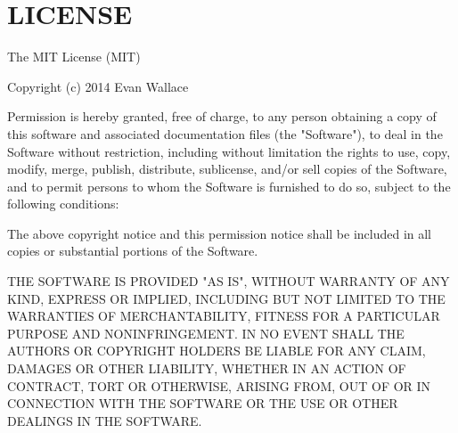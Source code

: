 \chapter{LICENSE}
\hypertarget{md_node__modules_2jest-runner_2node__modules_2source-map-support_2_l_i_c_e_n_s_e}{}\label{md_node__modules_2jest-runner_2node__modules_2source-map-support_2_l_i_c_e_n_s_e}
The MIT License (MIT)

Copyright (c) 2014 Evan Wallace

Permission is hereby granted, free of charge, to any person obtaining a copy of this software and associated documentation files (the "{}\+Software"{}), to deal in the Software without restriction, including without limitation the rights to use, copy, modify, merge, publish, distribute, sublicense, and/or sell copies of the Software, and to permit persons to whom the Software is furnished to do so, subject to the following conditions\+:

The above copyright notice and this permission notice shall be included in all copies or substantial portions of the Software.

THE SOFTWARE IS PROVIDED "{}\+AS IS"{}, WITHOUT WARRANTY OF ANY KIND, EXPRESS OR IMPLIED, INCLUDING BUT NOT LIMITED TO THE WARRANTIES OF MERCHANTABILITY, FITNESS FOR A PARTICULAR PURPOSE AND NONINFRINGEMENT. IN NO EVENT SHALL THE AUTHORS OR COPYRIGHT HOLDERS BE LIABLE FOR ANY CLAIM, DAMAGES OR OTHER LIABILITY, WHETHER IN AN ACTION OF CONTRACT, TORT OR OTHERWISE, ARISING FROM, OUT OF OR IN CONNECTION WITH THE SOFTWARE OR THE USE OR OTHER DEALINGS IN THE SOFTWARE. 